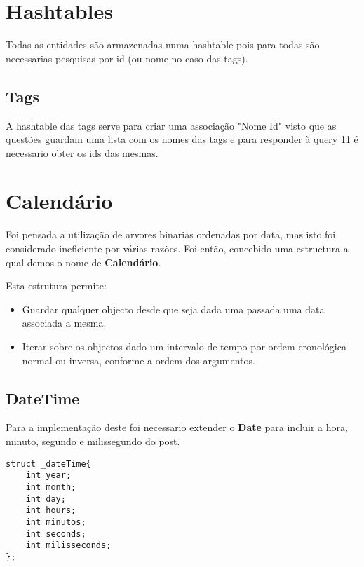 \documentclass[10pt,a4paper]{report}
\begin{document}
    \section{Hashtables}
        Todas as entidades são armazenadas numa hashtable pois para todas são
        necessarias pesquisas por id (ou nome no caso das tags).
        \subsection{Tags}
        A hashtable das tags serve para criar uma associação "Nome Id" visto que
        as questões guardam uma lista com os nomes das tags e para responder à
        query 11 é necessario obter os ids das mesmas.

    \section{Calendário}
        Foi pensada a utilização de arvores binarias ordenadas por data,
        mas isto foi considerado ineficiente por várias razões. Foi então,
        concebido uma estructura a qual demos o nome de \textbf{Calendário}.

        Esta estrutura permite:
        \begin{itemize}
                \item Guardar qualquer objecto desde que seja dada
                      uma passada uma data associada a mesma.
                \item Iterar sobre os objectos dado um intervalo de tempo
                      por ordem cronológica normal ou inversa, conforme a
                      ordem dos argumentos.
        \end{itemize}
        \subsection{DateTime}
        Para a implementação deste foi necessario extender o \textbf{Date} para
        incluir a hora, minuto, segundo e milissegundo do post.
    \begin{verbatim}
struct _dateTime{
    int year;
    int month;
    int day;
    int hours;
    int minutos;
    int seconds;
    int milisseconds;
};
    \end{verbatim}
\end{document}
